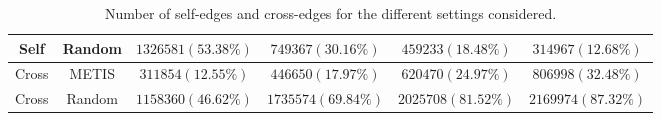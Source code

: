 \begin{table*}
\begin{tabular}{cc|cccc|}
\multicolumn{1}{c|}{Self }                & Random                    & \multicolumn{1}{c|}{$1326581(53.38\%)$} & \multicolumn{1}{c|}{$749367(30.16\%)$} & \multicolumn{1}{c|}{$459233(18.48\%)$} & \multicolumn{1}{c}{$314967(12.68\%)$} \\ \hline
\multicolumn{1}{c|}{Cross }               & METIS                      & \multicolumn{1}{c|}{$311854(12.55\%)$} & \multicolumn{1}{c|}{$446650(17.97\%)$} & \multicolumn{1}{c|}{$620470(24.97\%)$} & \multicolumn{1}{c}{$806998(32.48\%)$} \\ \hline
\multicolumn{1}{c|}{Cross }               & Random               & \multicolumn{1}{c|}{$1158360(46.62\%)$} & \multicolumn{1}{c|}{$1735574(69.84\%)$} & \multicolumn{1}{c|}{$2025708(81.52\%)$} & \multicolumn{1}{c}{$2169974(87.32\%)$} \\ \hline
\end{tabular}
\caption{\label{table:edges} Number of self-edges and cross-edges for the different settings considered. }

\end{table*}
